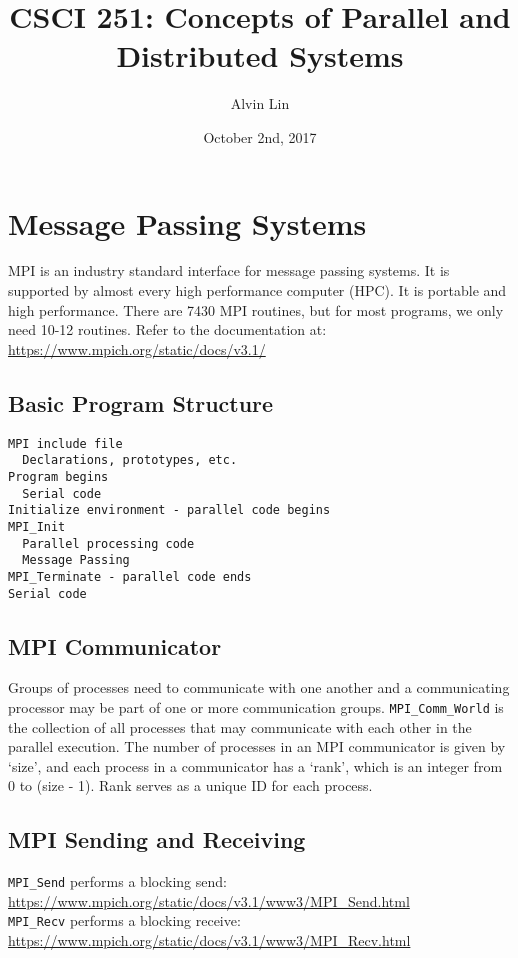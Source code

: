 \documentclass{math}
\title{CSCI 251: Concepts of Parallel and Distributed Systems}
\author{Alvin Lin}
\date{October 2nd, 2017}
\begin{document}
\maketitle

\section*{Message Passing Systems}
MPI is an industry standard interface for message passing systems. It is
supported by almost every high performance computer (HPC). It is portable and
high performance. There are 7430 MPI routines, but for most programs, we only
need 10-12 routines. Refer to the documentation at: \\
\url{https://www.mpich.org/static/docs/v3.1/}

\subsection*{Basic Program Structure}
\begin{lstlisting}
MPI include file
  Declarations, prototypes, etc.
Program begins
  Serial code
Initialize environment - parallel code begins
MPI_Init
  Parallel processing code
  Message Passing
MPI_Terminate - parallel code ends
Serial code
\end{lstlisting}

\subsection*{MPI Communicator}
Groups of processes need to communicate with one another and a communicating
processor may be part of one or more communication groups.
\texttt{MPI\_Comm\_World} is the collection of all processes that may
communicate with each other in the parallel execution. The number of processes
in an MPI communicator is given by `size', and each process in a communicator
has a `rank', which is an integer from 0 to (size - 1). Rank serves as a
unique ID for each process.

\subsection*{MPI Sending and Receiving}
\texttt{MPI\_Send} performs a blocking send: \\
\url{https://www.mpich.org/static/docs/v3.1/www3/MPI_Send.html} \\
\texttt{MPI\_Recv} performs a blocking receive: \\
\url{https://www.mpich.org/static/docs/v3.1/www3/MPI_Recv.html}
\end{document}
